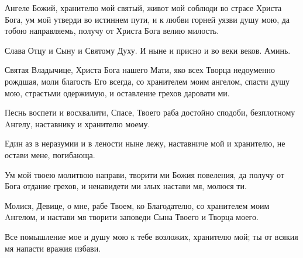\begin{mymulticols}



Ангеле Божий, хранителю мой святый, живот мой соблюди во страсе Христа Бога, ум мой утверди во истиннем пути, и к любви горней уязви душу мою, да тобою направляемь, получу от Христа Бога велию милость.

Слава Отцу и Сыну и Святому Духу. И ныне и присно и во веки веков. Аминь.


Святая Владычице, Христа Бога нашего Мати, яко всех Творца недоуменно рождшая, моли благость Его всегда, со хранителем моим ангелом, спасти душу мою, страстьми одержимую, и оставление грехов даровати ми.





Песнь воспети и восхвалити, Спасе, Твоего раба достойно сподоби, безплотному Aнгелу, наставнику и хранителю моему.


Един аз в неразумии и в лености ныне лежу, наставниче мой и хранителю, не остави мене, погибающа.

\slava

Ум мой твоею молитвою направи, творити ми Божия повеления, да получу от Бога отдание грехов, и ненавидети ми злых настави мя, молюся ти.

\inyne

Молися, Девице, о мне, рабе Твоем, ко Благодателю, со хранителем моим Aнгелом, и настави мя творити заповеди Сына Твоего и Творца моего.




Все помышление мое и душу мою к тебе возложих, хранителю мой; ты от всякия мя напасти вражия избави.


\end{mymulticols}
